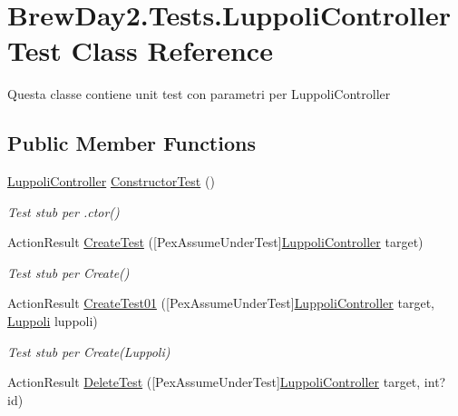 \hypertarget{class_brew_day2_1_1_tests_1_1_luppoli_controller_test}{}\section{Brew\+Day2.\+Tests.\+Luppoli\+Controller\+Test Class Reference}
\label{class_brew_day2_1_1_tests_1_1_luppoli_controller_test}


Questa classe contiene unit test con parametri per Luppoli\+Controller 


\subsection*{Public Member Functions}
\begin{DoxyCompactItemize}
\item 
\mbox{\hyperlink{class_brew_day2_1_1_controllers_1_1_luppoli_controller}{Luppoli\+Controller}} \mbox{\hyperlink{class_brew_day2_1_1_tests_1_1_luppoli_controller_test_a9c67a50021427183676b63d405386e43}{Constructor\+Test}} ()
\begin{DoxyCompactList}\small\item\em Test stub per .ctor()\end{DoxyCompactList}\item 
Action\+Result \mbox{\hyperlink{class_brew_day2_1_1_tests_1_1_luppoli_controller_test_acafca0d4a5a48475cded38d19039c11f}{Create\+Test}} (\mbox{[}Pex\+Assume\+Under\+Test\mbox{]}\mbox{\hyperlink{class_brew_day2_1_1_controllers_1_1_luppoli_controller}{Luppoli\+Controller}} target)
\begin{DoxyCompactList}\small\item\em Test stub per Create()\end{DoxyCompactList}\item 
Action\+Result \mbox{\hyperlink{class_brew_day2_1_1_tests_1_1_luppoli_controller_test_a5bb048805f9c0b5c0dec59410a14f13c}{Create\+Test01}} (\mbox{[}Pex\+Assume\+Under\+Test\mbox{]}\mbox{\hyperlink{class_brew_day2_1_1_controllers_1_1_luppoli_controller}{Luppoli\+Controller}} target, \mbox{\hyperlink{class_brew_day2_1_1_models_1_1_luppoli}{Luppoli}} luppoli)
\begin{DoxyCompactList}\small\item\em Test stub per Create(\+Luppoli)\end{DoxyCompactList}\item 
Action\+Result \mbox{\hyperlink{class_brew_day2_1_1_tests_1_1_luppoli_controller_test_a44d3f1c5b074f54ce2239f4160008ed3}{Delete\+Test}} (\mbox{[}Pex\+Assume\+Under\+Test\mbox{]}\mbox{\hyperlink{class_brew_day2_1_1_controllers_1_1_luppoli_controller}{Luppoli\+Controller}} target, int? id)

\end{DoxyCompactItemize}

